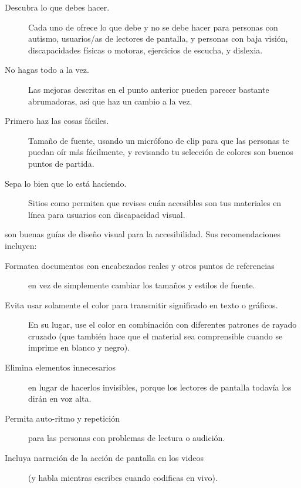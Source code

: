 \begin{description}

\item[Descubra lo que debes hacer.]
  Cada uno de 
  ofrece lo que debe y no se debe hacer para personas con autismo,
  usuarios/as de lectores de pantalla,
  y personas con baja visión,
  discapacidades físicas o motoras,
  ejercicios de escucha,
  y dislexia.

\item[No hagas todo a la vez.]
  Las mejoras descritas en el punto anterior pueden parecer bastante abrumadoras,
  así que haz un cambio a la vez.

\item[Primero haz las cosas fáciles.]
  Tamaño de fuente,
  usando un micrófono de clip para que las personas te puedan oír más fácilmente,
  y revisando tu selección de colores son buenos puntos de partida.

\item[Sepa lo bien que lo está haciendo.]
  Sitios como  permiten que revises
  cuán accesibles son tus materiales en línea para usuarios con discapacidad visual.

\end{description}

\cite{Coom2012,Burg2015} son buenas guías de diseño visual para la accesibilidad.
Sus recomendaciones incluyen:

\begin{description}

\item[Formatea documentos con encabezados reales y otros puntos de referencias]
  en vez de simplemente cambiar los tamaños y estilos de fuente.

\item[Evita usar solamente el color para transmitir significado en texto o gráficos.]
  En su lugar, use el color en combinación con diferentes patrones de rayado cruzado
  (que también hace que el material sea comprensible cuando se imprime en blanco y negro).

\item[Elimina elementos innecesarios]
  en lugar de hacerlos invisibles,
  porque los lectores de pantalla todavía los dirán en voz alta.

\item[Permita auto-ritmo y repetición]
  para las personas con problemas de lectura o audición.

\item[Incluya narración de la acción de pantalla en los videos]
  (y habla mientras escribes cuando codificas en vivo).

\end{description}

